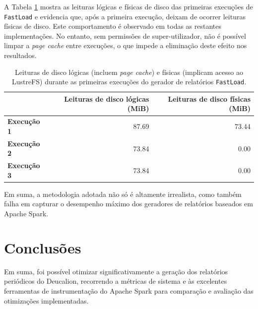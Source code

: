 \documentclass[11pt, a4paper]{article}
\begin{document}
A Tabela \ref{pagecache-demo} mostra as leituras lógicas e físicas de disco das primeiras execuções
de \texttt{FastLoad} e evidencia que, após a primeira execução, deixam de ocorrer leituras físicas
de disco. Este comportamento é observado em todas as restantes implementações. No entanto, sem
permissões de super-utilizador, não é possível limpar a \emph{page cache} entre execuções, o que
impede a eliminação deste efeito nos resultados.

\begin{table}[H]
    \centering
    \begin{tabular}{|l|r|r|}
        \hline
                                                 &
        \textbf{Leituras de disco lógicas (MiB)} &
        \textbf{Leituras de disco físicas (MiB)} \\
        \hline

        \textbf{Execução 1} &
                      87.69 &
                      73.44 \\ \hline

        \textbf{Execução 2} &
                      73.84 &
                       0.00 \\ \hline

        \textbf{Execução 3} &
                      73.84 &
                       0.00 \\ \hline
    \end{tabular}

    \caption{
        \onehalfspacing
        Leituras de disco lógicas (incluem \emph{page cache}) e físicas (implicam acesso ao
        LustreFS) durante as primeiras execuções do gerador de relatórios \texttt{FastLoad}.
    }
    \label{pagecache-demo}
\end{table}

Em suma, a metodologia adotada não só é altamente irrealista, como também falha em capturar o
desempenho máximo dos geradores de relatórios baseados em Apache Spark.

\section{Conclusões} %

Em suma, foi possível otimizar significativamente a geração dos relatórios periódicos do Deucalion,
recorrendo a métricas de sistema e às excelentes ferramentas de instrumentação do Apache Spark para
comparação e avaliação das otimizações implementadas.
\end{document}
